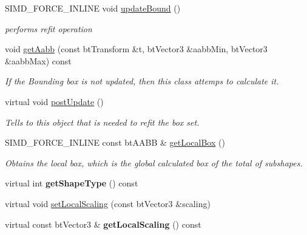 \begin{DoxyCompactItemize}
\item 
S\+I\+M\+D\+\_\+\+F\+O\+R\+C\+E\+\_\+\+I\+N\+L\+I\+N\+E void \hyperlink{classbt_g_impact_shape_interface_acb26c2d7a2aecabd06b996b72b848492}{update\+Bound} ()
\begin{DoxyCompactList}\small\item\em performs refit operation \end{DoxyCompactList}\item 
void \hyperlink{classbt_g_impact_shape_interface_a418d1f35f4dd58e4d3195aee639b615b}{get\+Aabb} (const bt\+Transform \&t, bt\+Vector3 \&aabb\+Min, bt\+Vector3 \&aabb\+Max) const 
\begin{DoxyCompactList}\small\item\em If the Bounding box is not updated, then this class attemps to calculate it. \end{DoxyCompactList}\item 
\hypertarget{classbt_g_impact_shape_interface_ac430754948ac92d6f70b81e88416c96a}{virtual void \hyperlink{classbt_g_impact_shape_interface_ac430754948ac92d6f70b81e88416c96a}{post\+Update} ()}\label{classbt_g_impact_shape_interface_ac430754948ac92d6f70b81e88416c96a}

\begin{DoxyCompactList}\small\item\em Tells to this object that is needed to refit the box set. \end{DoxyCompactList}\item 
\hypertarget{classbt_g_impact_shape_interface_ad4f12ac5c91bf67349109aecdec65455}{S\+I\+M\+D\+\_\+\+F\+O\+R\+C\+E\+\_\+\+I\+N\+L\+I\+N\+E const bt\+A\+A\+B\+B \& \hyperlink{classbt_g_impact_shape_interface_ad4f12ac5c91bf67349109aecdec65455}{get\+Local\+Box} ()}\label{classbt_g_impact_shape_interface_ad4f12ac5c91bf67349109aecdec65455}

\begin{DoxyCompactList}\small\item\em Obtains the local box, which is the global calculated box of the total of subshapes. \end{DoxyCompactList}\item 
\hypertarget{classbt_g_impact_shape_interface_ada5489b5e81c4b11d46103dadea5d52b}{virtual int {\bfseries get\+Shape\+Type} () const }\label{classbt_g_impact_shape_interface_ada5489b5e81c4b11d46103dadea5d52b}

\item 
virtual void \hyperlink{classbt_g_impact_shape_interface_adec0bd43cd0105b1d0dc172bc7db50d8}{set\+Local\+Scaling} (const bt\+Vector3 \&scaling)
\item 
\hypertarget{classbt_g_impact_shape_interface_adbda098e714881e2258b33c5b1425a46}{virtual const bt\+Vector3 \& {\bfseries get\+Local\+Scaling} () const }\label{classbt_g_impact_shape_interface_adbda098e714881e2258b33c5b1425a46}


\end{DoxyCompactItemize}
